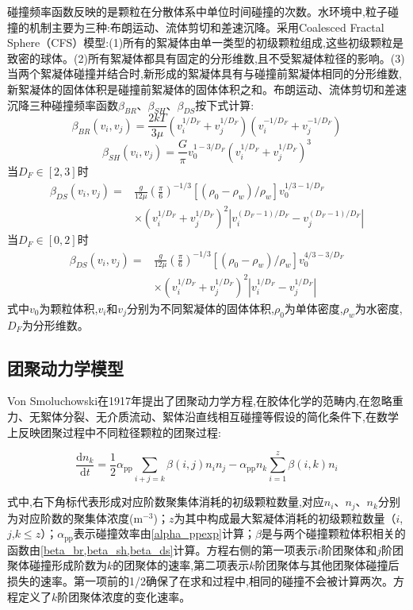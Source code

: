 碰撞频率函数反映的是颗粒在分散体系中单位时间碰撞的次数。水环境中,粒子碰撞的机制主要为三种:布朗运动、流体剪切和差速沉降\cite{ThomasJudd-749}。采用Coalesced Fractal Sphere（CFS）模型\cite{LeeBonner-748}:(1)所有的絮凝体由单一类型的初级颗粒组成,这些初级颗粒是致密的球体。(2)所有絮凝体都具有固定的分形维数,且不受絮凝体粒径的影响。(3) 当两个絮凝体碰撞并结合时,新形成的絮凝体具有与碰撞前絮凝体相同的分形维数,新絮凝体的固体体积是碰撞前絮凝体的固体体积之和。布朗运动、流体剪切和差速沉降三种碰撞频率函数$\beta_{BR}$、$\beta_{SH}$、$\beta_{DS}$按下式计算\cite{LeeBonner-748}:
\begin{equation}\label{beta_br}
    \beta_{BR}(v_i,v_j)=\frac{2kT}{3\mu}(v_i^{1/D_F}+v_j^{1/D_F})(v_i^{-1/D_F}+v_j^{-1/D_F})
\end{equation}
\begin{equation}\label{beta_sh}
    \beta_{SH}(v_i,v_j)=\frac{G}{\pi}v_0^{1-3/D_F}{(v_i^{1/D_F}+v_j^{1/D_F})}^3
\end{equation}
当$D_F\in[2,3]$时
\begin{align}\label{beta_ds}
    \beta_{DS}(v_i,v_j)=&\frac{g}{12\mu}{(\frac{\pi}{6})}^{-1/3}[(\rho_0-\rho_w)/\rho_w]v_0^{1/3-1/D_F}\\ & \times(v_i^{1/D_F}+v_j^{1/D_F})^2\left|v_i^{(D_F-1)/D_F}-v_j^{(D_F-1)/D_F}\right| \nonumber
\end{align}
当$D_F\in[0,2]$时
\begin{align}
    \beta_{DS}(v_i,v_j)=&\frac{g}{12\mu}{(\frac{\pi}{6})}^{-1/3}[(\rho_0-\rho_w)/\rho_w]v_0^{4/3-3/D_F}\\ &\times(v_i^{1/D_F}+v_j^{1/D_F})^2\left|v_i^{1/D_F}-v_j^{1/D_F}\right| \nonumber
\end{align}
式中$v_0$为颗粒体积,$v_i$和$v_j$分别为不同絮凝体的固体体积,$\rho_0$为单体密度,$\rho_w$为水密度,$D_F$为分形维数。

\subsection{团聚动力学模型}

Von Smoluchowski在1917年提出了团聚动力学方程\cite{Smoluchowski-752},在胶体化学的范畴内,在忽略重力、无絮体分裂、无介质流动、絮体沿直线相互碰撞等假设的简化条件下,在数学上反映团聚过程中不同粒径颗粒的团聚过程\cite{Smoluchowski-752}:

\begin{equation}\label{smoluchowski}
    \frac{\mathrm{d}n_k}{\mathrm{d}t}=\frac{1}{2}\alpha_\mathrm{pp}\sum_{i+j=k}{\beta(i,j)n_in_j}-\alpha_\mathrm{pp} n_k\sum_{i=1}^{z}{\beta(i,k)n_i}
\end{equation}

式中,右下角标代表形成对应阶数聚集体消耗的初级颗粒数量,对应$n_i$、$n_j$、$n_k$分别为对应阶数的聚集体浓度($\mathrm{m^{-3}}$)；$z$为其中构成最大絮凝体消耗的初级颗粒数量（$i$,$j$,$k\leq z$）；$\alpha_\mathrm{pp}$表示碰撞效率由\cref{alpha_ppexp}计算；$\beta$是与两个碰撞颗粒体积相关的函数由\cref{beta_br,beta_sh,beta_ds}计算。方程右侧的第一项表示$i$阶团聚体和$j$阶团聚体碰撞形成阶数为$k$的团聚体的速率,第二项表示$k$阶团聚体与其他团聚体碰撞后损失的速率。第一项前的1/2确保了在求和过程中,相同的碰撞不会被计算两次。方程定义了$k$阶团聚体浓度的变化速率。
